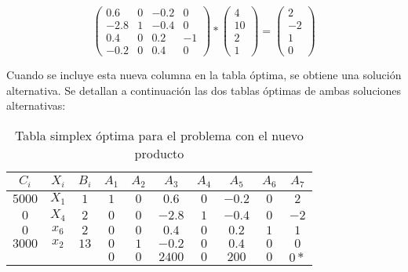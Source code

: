 \documentclass[a4paper,11pt]{article}
\begin{document}
\[
  \begin{pmatrix}
    0.6 & 0 & -0.2 & 0 \\
   -2.8 & 1 & -0.4 & 0 \\
    0.4 & 0 & 0.2  & -1 \\
   -0.2 & 0 & 0.4  & 0
  \end{pmatrix}
  *
  \begin{pmatrix}
    4 \\
    10 \\
    2 \\
    1
  \end{pmatrix}
  =
  \begin{pmatrix}
    2 \\
    -2 \\
    1 \\
    0
  \end{pmatrix}
\]

Cuando se incluye esta nueva columna en la tabla óptima, se obtiene una
solución alternativa. Se detallan a continuación las dos tablas óptimas de
ambas soluciones alternativas: 

\begin{table}[h!]
\centering
\begin{tabular}{ | c | c | c || c | c | c | c | c | c | c | }
  \hline
  \(C_i\)  & \(X_i\) & \(B_i\) & \(A_1\) & \(A_2\) & \(A_3\)  & \(A_4\) & \(A_5\)  & \(A_6\) & \(A_7\) \\ \hline
 \(5000\)  & \(X_1\) & \(1\)   & \(1\)   & \(0\)   & \(0.6\)  & \(0\)   & \(-0.2\) & \(0\)   & \(2\) \\ \hline
 \(0\)     & \(X_4\) & \(2\)   & \(0\)   & \(0\)   & \(-2.8\) & \(1\)   & \(-0.4\) & \(0\)   & \(-2\) \\ \hline
  \(0\)    & \(x_6\) & \(2\)   & \(0\)   & \(0\)   & \(0.4\)  & \(0\)   & \(0.2\)  & \(1\)   & \(1\) \\ \hline
  \(3000\) & \(x_2\) & \(13\)  & \(0\)   & \(1\)   & \(-0.2\) & \(0\)   & \(0.4\)  & \(0\)   & \(0\) \\ \hline \hline
  \multicolumn{3}{|c|}{ }      & \(0\)   & \(0\)   & \(2400\) & \(0\)   & \(200\)  & \(0\)   & \(0*\) \\ \hline
\end{tabular}
\caption{Tabla simplex óptima para el problema con el nuevo producto}
\end{table}
\end{document}
